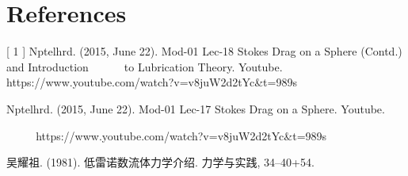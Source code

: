 \documentclass{report}
\begin{document}
\section*{References}
[ 1 ] Nptelhrd. (2015, June 22). Mod-01 Lec-18 Stokes Drag on a Sphere (Contd.) and Introduction $~~~~~~~~~~~~~$to Lubrication Theory. Youtube. https://www.youtube.com/watch?v=v8juW2d2tYc\&t=989s
\par
\indent
\par
\indent [ 2 ] Nptelhrd. (2015, June 22). Mod-01 Lec-17 Stokes Drag on a Sphere. Youtube. \par \noindent $~~~~~~~~~~~~$https://www.youtube.com/watch?v=v8juW2d2tYc\&t=989s
\par \indent \par 
\indent [ 3 ]吴耀祖. (1981). 低雷诺数流体力学介绍. 力学与实践, 34–40+54. 
\end{document}
